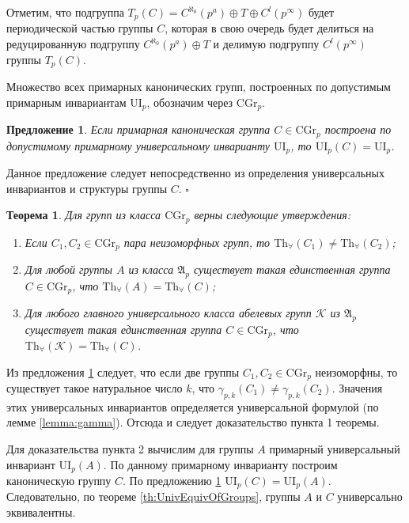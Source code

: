 \documentclass[a4paper,11pt,twoside]{article}
\newtheorem{theorem}{Теорема}[section]
\newtheorem{proposition}{Предложение}[section]
\def\proof{{\noindent{\bf Доказательство.}} }
\def\A{{\mathfrak{A}}}
\def\K{{\mathcal{K}}}
\def\Tha{{\mathrm{Th}_\forall}}
\def\CG{{\mathrm{CGr}}}
\def\ui{{\mathrm{UI}}}
\begin{document}
Отметим, что подгруппа $T_p(C) = C^{\aleph_0}(p^a) \oplus T \oplus C^l(p^\infty)$ будет периодической частью группы $C$, которая в свою очередь будет делиться на редуцированную подгруппу $C^{\aleph_0}(p^a) \oplus T$ и делимую подгруппу $C^l(p^\infty)$ группы $T_p(C)$.

Множество всех примарных канонических групп, построенных по допустимым примарным инвариантам $\ui_p$, обозначим через $\CG_p$.

\begin{proposition}\label{prop:UnivEnvForCannonicalGroup}
Если примарная каноническая группа $C \in \CG_p$ построена по допустимому примарному универсальному инварианту $\ui_p$, то $\ui_p(C) = \ui_p$.
\end{proposition}
\proof Данное предложение следует непосредственно из определения универсальных инвариантов и структуры группы $C$. $\square$

\begin{theorem}\label{th:CannonicalGroupsP}
Для групп из класса $\CG_p$ верны следующие утверждения:
\begin{enumerate}
\item Если $C_1, C_2 \in \CG_p$ пара неизоморфных групп, то $\Tha(C_1) \neq \Tha(C_2)$;
\item Для любой группы $A$ из класса $\A_p$ существует такая единственная группа $C \in \CG_p$, что $\Tha(A) = \Tha(C)$;
\item Для любого главного универсального класса абелевых групп $\K$ из $\A_p$ существует такая единственная группа $C \in \CG_p$, что $\Tha(\K) = \Tha(C)$.
\end{enumerate}
\end{theorem}
\proof Из предложения \ref{prop:UnivEnvForCannonicalGroup} следует, что если две группы $C_1, C_2 \in \CG_p$ неизоморфны, то существует такое натуральное число $k$, что $\gamma_{p,k}(C_1) \neq \gamma_{p,k}(C_2)$. Значения этих универсальных инвариантов определяется универсальной формулой (по лемме \ref{lemma:gamma}). Отсюда и следует доказательство пункта 1 теоремы.

Для доказательства пункта 2 вычислим для группы $A$ примарный универсальный инвариант $\ui_p(A)$. По данному примарному инварианту построим каноническую группу $C$. По предложению \ref{prop:UnivEnvForCannonicalGroup} $\ui_p(C) = \ui_p(A)$. Следовательно, по теореме \ref{th:UnivEquivOfGroups}, группы $A$ и $C$ универсально эквивалентны.
\end{document}
